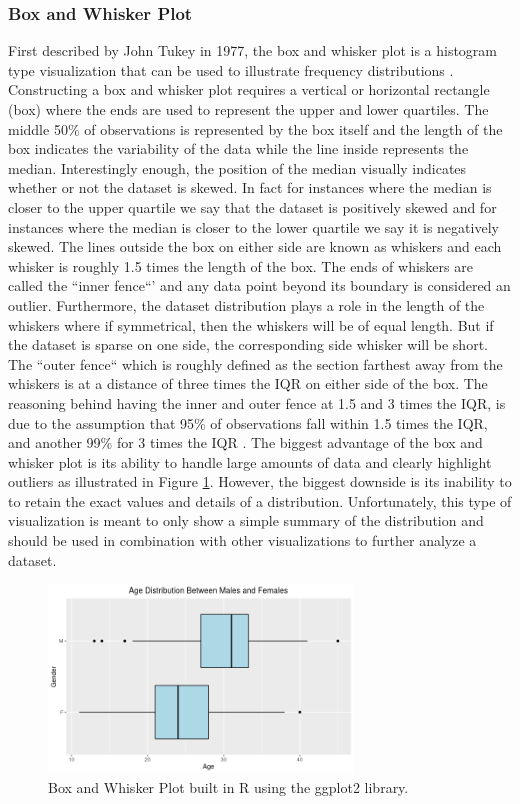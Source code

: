 \subsubsection{Box and Whisker Plot}
First described by John Tukey in 1977, the box and whisker plot is a histogram
type visualization that can be used to illustrate frequency distributions \cite{c10}. Constructing
a box and whisker plot requires a vertical or horizontal rectangle (box) where the 
ends are used to represent the upper and lower quartiles. The middle 50\% of observations 
is represented by the box itself and the length of the box indicates the variability 
of the data while the line inside represents the median. Interestingly enough, 
the position of the median visually indicates whether or not the dataset is skewed. 
In fact for instances where the median is closer to the upper quartile we say that 
the dataset is positively skewed and for instances where the median is closer to 
the lower quartile we say it is negatively skewed. 
The lines outside the box on either side are known as whiskers and each whisker 
is roughly 1.5 times the length of the box. The ends of whiskers are called the 
``inner fence``' and any data point beyond its boundary is considered an outlier. 
Furthermore, the dataset distribution plays a role in the length of the whiskers 
where if symmetrical, then the whiskers will be of equal length. But if the dataset 
is sparse on one side, the corresponding side whisker will be short. The ``outer fence``
which is roughly defined as the section farthest away from the whiskers is at a 
distance of three times the IQR on either side of the box. The reasoning behind 
having the inner and outer fence at 1.5 and 3 times the IQR, is due to the assumption 
that 95\% of observations fall within 1.5 times the IQR, and another 99\% for 3 
times the IQR \cite{c10}. The biggest advantage of the box and whisker plot is its ability 
to handle large amounts of data and clearly highlight outliers as illustrated in 
Figure \ref{figure:box_and_whisker}. However, the biggest downside is its inability to
to retain the exact values and details of a distribution. Unfortunately, this type
of visualization is meant to only show a simple summary of the distribution and
should be used in combination with other visualizations to further analyze a dataset.

\begin{figure}[!ht]
    \centering
        \includegraphics[height=5cm]{figures/box_and_whisker.png}
    \caption{Box and Whisker Plot built in R using the ggplot2 library.}
    \label{figure:box_and_whisker}
\end{figure} 

